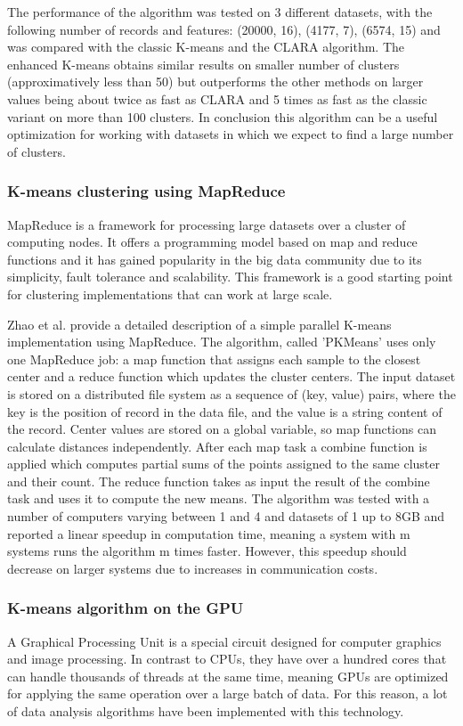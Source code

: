 \documentclass[12pt]{article}
\begin{document}
	The performance of the algorithm was tested on 3 different datasets, with the following number of records and features: (20000, 16), (4177, 7), (6574, 15) and was compared with the classic K-means and the CLARA algorithm. The enhanced K-means obtains similar results on smaller number of clusters (approximatively less than 50) but outperforms the other methods on larger values being about twice as fast as CLARA and 5 times as fast as the classic variant on more than 100 clusters. In conclusion this algorithm can be a useful optimization for working with datasets in which we expect to find a large number of clusters.
	
	\subsubsection{K-means clustering using MapReduce}
	MapReduce\cite{MapReduce} is a framework for processing large datasets over a cluster of computing nodes. It offers a programming model based on map and reduce functions and it has gained popularity in the big data community due to its simplicity, fault tolerance and scalability. This framework is a good starting point for clustering implementations that can work at large scale.
	
	Zhao et al.\cite{ParallelKmeansClusteringBasedOnMapReduce} provide a detailed description of a simple parallel K-means implementation using MapReduce. The algorithm, called 'PKMeans' uses only one MapReduce job: a map function that assigns each sample to the closest center and a reduce function which updates the cluster centers. The input dataset is stored on a distributed file system as a sequence of (key, value) pairs, where the key is the position of record in the data file, and the value is a string content of the record. Center values are stored on a global variable, so map functions can calculate distances independently. After each map task a combine function is applied which computes partial sums of the points assigned to the same cluster and their count. The reduce function takes as input the result of the combine task and uses it to compute the new means. The algorithm was tested with a number of computers varying between 1 and 4 and datasets of 1 up to 8GB and reported a linear speedup in computation time, meaning a system with m systems runs the algorithm m times faster. However, this speedup should decrease on larger systems due to increases in communication costs.

	\subsubsection{K-means algorithm on the GPU}
	A Graphical Processing Unit\cite{GPUDef} is a special circuit designed for computer graphics and image processing. In contrast to CPUs, they have over a hundred cores that can handle thousands of threads at the same time, meaning GPUs are optimized for applying the same operation over a large batch of data. For this reason, a lot of data analysis algorithms have been implemented with this technology.
	
\end{document}
